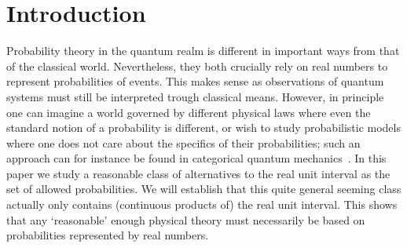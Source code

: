 \documentclass[10pt,conference]{IEEEtran}
\theoremstyle{definition}
\begin{document}

\section{Introduction}


Probability theory in the quantum realm is different in important ways from that of the classical world. Nevertheless, they both crucially rely on real numbers to represent probabilities of events. This makes sense as observations of quantum systems must still be interpreted trough classical means. However, in principle one can imagine a world governed by different physical laws where even the standard notion of a probability is different, or wish to study probabilistic models where one does not care about the specifics of their probabilities; such an approach can for instance be found in categorical quantum mechanics~\cite{abramsky2004categorical,gogioso2017fantastic,tull2016reconstruction}.
In this paper we study a reasonable class of alternatives to the real unit interval as the set of allowed probabilities. We will establish that this quite general seeming class actually only contains (continuous products of) the real unit interval. This shows that any `reasonable' enough physical theory must necessarily be based on probabilities represented by real numbers.
\end{document}
